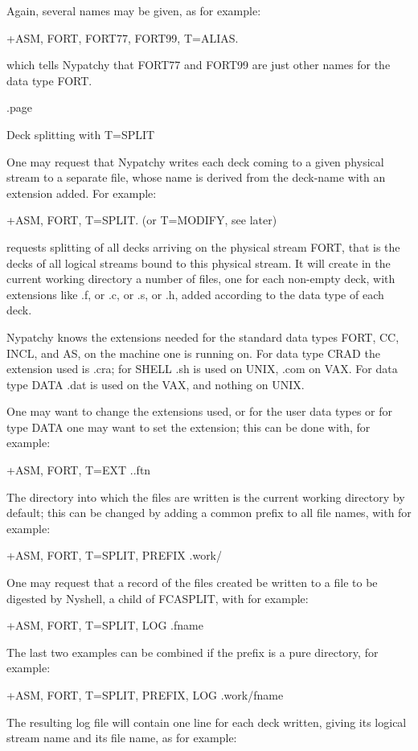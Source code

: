 Again, several names may be given, as for example:

      +ASM, FORT, FORT77, FORT99, T=ALIAS.

which tells Nypatchy that FORT77 and FORT99 are just other names for
the data type FORT.

.page
\item
Deck splitting with T=SPLIT

One may request that Nypatchy writes each deck coming to a given physical
stream to a separate file, whose name is derived from the deck-name with
an extension added. For example:

      +ASM, FORT, T=SPLIT.     (or T=MODIFY, see later)

requests splitting of all decks arriving on the physical stream FORT, that
is the decks of all logical streams bound to this physical stream. It will
create in the current working directory a number of files, one for each
non-empty deck, with extensions like .f, or .c, or .s, or .h, added
according to the data type of each deck.

Nypatchy knows the extensions needed for the standard data types FORT, CC,
INCL, and AS, on the machine one is running on. For data type CRAD the
extension used is .cra; for SHELL .sh is used on UNIX, .com on VAX.
For data type DATA .dat is used on the VAX, and nothing on UNIX.

One may want to change the extensions used, or for the user data types or
for type DATA one may want to set the extension; this can be done with,
for example:

      +ASM, FORT, T=EXT   ..ftn

The directory into which the files are written is the current working
directory by default; this can be changed by adding a common prefix to
all file names, with for example:

      +ASM, FORT, T=SPLIT, PREFIX   .work/

One may request that a record of the files created be written to a file
to be digested by Nyshell, a child of FCASPLIT, with for example:

      +ASM, FORT, T=SPLIT, LOG   .fname

The last two examples can be combined if the prefix is a pure
directory, for example:

      +ASM, FORT, T=SPLIT, PREFIX, LOG   .work/fname

The resulting log file will contain one line for each deck written,
giving its logical stream name and its file name, as for example:

